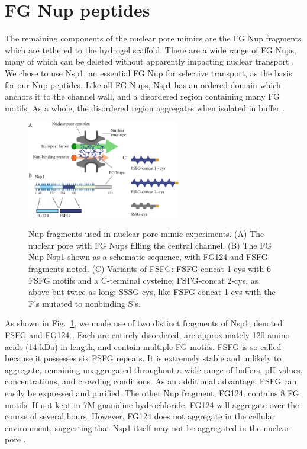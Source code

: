 \section{FG Nup peptides}
\label{sec:Nups}

The remaining components of the nuclear pore mimics are the FG Nup fragments which are tethered to the hydrogel scaffold.  There are a wide range of FG Nups, many of which can be deleted without apparently impacting nuclear transport \cite{strawn04, zeitler04}.  We chose to use Nsp1, an essential FG Nup for selective transport, as the basis for our Nup peptides. Like all FG Nups, Nsp1 has an ordered domain which anchors it to the channel wall, and a disordered region containing many FG motifs.  As a whole, the disordered region aggregates when isolated in buffer \cite{frey06, frey07}.

\begin{figure}
\caption[Nup fragments used in nuclear pore mimic experiments.]{Nup fragments used in nuclear pore mimic experiments.  (A) The nuclear pore with FG Nups filling the central channel. (B) The FG Nup Nsp1 shown as a schematic sequence, with FG124 and FSFG fragments noted. (C) Variants of FSFG: FSFG-concat 1-cys with 6 FSFG motifs and a C-terminal cysteine; FSFG-concat 2-cys, as above but twice as long; SSSG-cys, like FSFG-concat 1-cys with the F's mutated to nonbinding S's.}
\centering
\includegraphics[width=0.6\textwidth]{figs/ch03/Nup-constructs.pdf}
\label{fig:Nups}
\end{figure}

As shown in Fig.~\ref{fig:Nups}, we made use of two distinct fragments of Nsp1, denoted FSFG and FG124 \cite{hough15}.  Each are entirely disordered, are approximately 120 amino acids (14 kDa) in length, and contain multiple FG motifs.  FSFG is so called because it possesses six FSFG repeats.  It is extremely stable and unlikely to aggregate, remaining unaggregated throughout a wide range of buffers, pH values, concentrations, and crowding conditions.  As an additional advantage, FSFG can easily be expressed and purified.  The other Nup fragment, FG124, contains 8 FG motifs.  If not kept in 7M guanidine hydrochloride, FG124 will aggregate over the course of several hours.  However, FG124 does not aggregate in the cellular environment, suggesting that Nsp1 itself may not be aggregated in the nuclear pore \cite{hough15}. 

